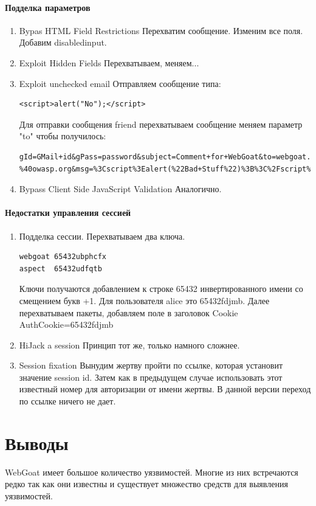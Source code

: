 \documentclass[10pt,a4paper]{article}
\begin{document}
\paragraph{Подделка параметров}
\begin{enumerate}
\item Bypas HTML Field Restrictions 
Перехватим сообщение. Изменим все поля. Добавим disabledinput.
\item Exploit Hidden Fields
Перехватываем, меняем...
\item Exploit unchecked email
Отправляем сообщение типа:
\begin{verbatim}
<script>alert("No");</script>
\end{verbatim}
Для отправки сообщения friend перехватываем сообщение меняем параметр "to" чтобы получилось: 
\begin{verbatim}
gId=GMail+id&gPass=password&subject=Comment+for+WebGoat&to=webgoat.admin
%40owasp.org&msg=%3Cscript%3Ealert(%22Bad+Stuff%22)%3B%3C%2Fscript%3E&SUBMIT=Send!
\end{verbatim}
\item Bypass Client Side JavaScript Validation
Аналогично.
\end{enumerate}
\paragraph{Недостатки управления сессией}
\begin{enumerate}
\item Подделка сессии. Перехватываем два ключа.
\begin{verbatim}
webgoat 65432ubphcfx
aspect  65432udfqtb
\end{verbatim}
Ключи получаются добавлением к строке 65432 инвертированного имени со смещением букв +1. Для пользователя alice это 65432fdjmb.
Далее перехватываем пакеты, добавляем поле в заголовок Cookie AuthCookie=65432fdjmb
\item HiJack a session
Принцип тот же, только намного сложнее.
\item Session fixation
Вынудим жертву пройти по ссылке, которая установит значение session id. Затем как в предыдущем случае использовать этот известный номер для авторизации от имени жертвы. В данной версии переход по ссылке ничего не дает.
\end{enumerate}
\section{Выводы}
WebGoat имеет большое количество уязвимостей. Многие из них встречаются редко так как они известны и существует множество средств для выявления уязвимостей.
\end{document}
